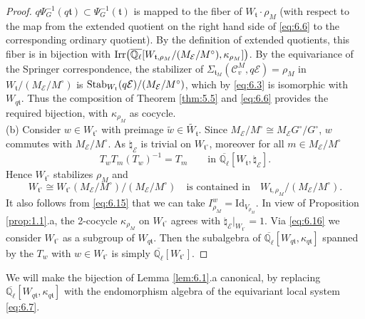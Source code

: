 \documentclass[11pt]{amsart}
\theoremstyle{definition}
\newcommand{\Q}{\mathbb Q}
\def\Irr{{\rm Irr}}
\def\cC{{\mathcal C}}
\def\cE{{\mathcal E}}
\def\ft{{\mathfrak t}}
\def\Stab{{\rm Stab}}
\begin{document}
\begin{proof}
$q \Psi_G^{-1}(q \ft) \subset \Psi_G^{-1} (\ft)$ is mapped to the fiber of
$W_\ft \cdot \rho_M$ (with respect to the map from the extended quotient on 
the right hand side of \eqref{eq:6.6} to the corresponding ordinary quotient).
By the definition of extended quotients, this fiber is in bijection with $\Irr 
\big( \overline{\Q_{\ell}}[W_{\ft,\rho_M} / (M_\cE / M^\circ), \kappa_{\rho_M}] \big)$.
By the equivariance of the Springer correspondence, the stabilizer of 
$\Sigma_{\ft_M}(\cC_v^M, q \cE) = \rho_M$ in 
$W_\ft / (M_\cE / M^\circ)$ is $\Stab_{W_\ft}(q \cE) / (M_\cE / M^\circ)$,
which by \eqref{eq:6.3} is isomorphic with $W_{q \ft}$. Thus the composition
of Theorem \ref{thm:5.5} and \eqref{eq:6.6} provides the required bijection,
with $\kappa_{\rho_M}$ as cocycle.\\
(b) Consider $w \in W_{\ft^\circ}$ with preimage $\tilde w \in \widetilde{W_\ft}$.
Since $M_\cE / M^\circ \cong M_\cE G^\circ / G^\circ$, $w$ commutes with
$M_\cE / M^\circ$. As $\natural_\cE$ is trivial on $W_{\ft^\circ}$, moreover
for all $m \in M_\cE / M^\circ$ 
\begin{equation}\label{eq:6.15}
T_w T_m (T_w )^{-1} = T_m \qquad \text{in } \overline{\Q_{\ell}}[W_\ft,\natural_\cE] . 
\end{equation}
Hence $W_{\ft^\circ}$ stabilizes $\rho_M$ and 
\[
W_{\ft^\circ} \cong W_{\ft^\circ} (M_\cE / M^\circ) / (M_\cE / M^\circ)
\quad \text{is contained in} \quad W_{\ft,\rho_M} / (M_\cE / M^\circ) .
\]
It also follows from \eqref{eq:6.15} that we can take $I^w_{\rho_M} = 
\mathrm{Id}_{V_{\rho_M}}$. In view of Proposition \ref{prop:1.1}.a, the 2-cocycle
$\kappa_{\rho_M}$ on $W_{\ft^\circ}$ agrees with $\natural_\cE |_{W_{\ft^\circ}} = 1$.
Via \eqref{eq:6.16} we consider $W_{\ft^\circ}$ as a subgroup of $W_{q \ft}$. 
Then the subalgebra of $\overline{\Q_{\ell}}[W_{q \ft}, \kappa_{q \ft}]$ spanned
by the $T_w$ with $w \in W_{\ft^\circ}$ is simply $\overline{\Q_{\ell}}[W_{\ft^\circ}]$.
\end{proof}

We will make the bijection of Lemma \ref{lem:6.1}.a canonical, by replacing
$\overline{\Q_{\ell}} [W_{q \ft},\kappa_{q \ft}]$ with the endomorphism algebra of the
equivariant local system \eqref{eq:6.7}.
\end{document}
